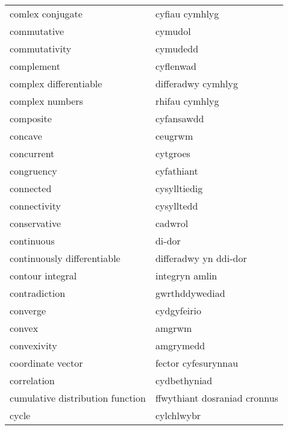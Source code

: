 \begin{supertabular}{p{0.22\textwidth}p{0.22\textwidth}}
                comlex conjugate &                  cyfiau cymhlyg \\
                     commutative &                         cymudol \\
                   commutativity &                        cymudedd \\
                      complement &                       cyflenwad \\
          complex differentiable &              differadwy cymhlyg \\
                 complex numbers &                  rhifau cymhlyg \\
                       composite &                      cyfansawdd \\
                         concave &                         ceugrwm \\
                      concurrent &                        cytgroes \\
                      congruency &                      cyfathiant \\
                       connected &                    cysylltiedig \\
                    connectivity &                      cysylltedd \\
                    conservative &                         cadwrol \\
                      continuous &                          di-dor \\
     continuously differentiable &           differadwy yn ddi-dor \\
                contour integral &                  integryn amlin \\
                   contradiction &                  gwrthddywediad \\
                        converge &                     cydgyfeirio \\
                          convex &                          amgrwm \\
                     convexivity &                       amgrymedd \\
               coordinate vector &             fector cyfesurynnau \\
                     correlation &                    cydbethyniad \\
cumulative distribution function &    ffwythiant dosraniad cronnus \\
                           cycle &                      cylchlwybr \\

\end{supertabular}
